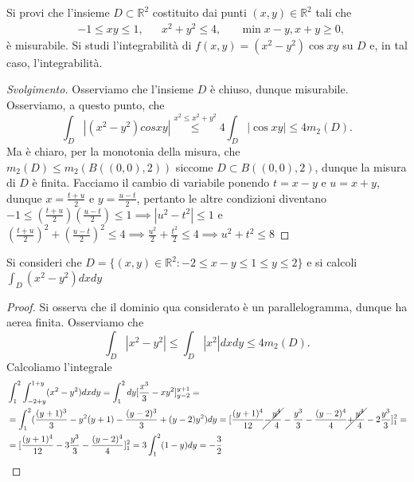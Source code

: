 \begin{exercise}
	Si provi che l'insieme $D \subset \mathbb{R}^2$ costituito dai punti $(x, y) \in \mathbb{R}^2$ tali che
	\begin{align*}
	&-1 \leq xy \leq 1, & &x^2 + y^2 \leq 4, & &\min{x-y, x+y} \geq 0,  
	\end{align*}
	è misurabile. Si studi l'integrabilità di $f(x, y) = (x^2 - y^2)\cos{xy}$ su $D$ e, in tal caso, l'integrabilità.
\end{exercise}
\begin{proof}[Svolgimento]
	Osserviamo che l'insieme $D$ è chiuso, dunque misurabile. Osserviamo, a questo punto, che
	$$
		\int_D |(x^2 - y^2)cos{xy}| \stackrel{x^2 \leq x^2 + y^2}{\leq} 4 \int_D |\cos{xy}| \leq 4 m_2(D).
	$$
	Ma è chiaro, per la monotonia della misura, che $m_2(D) \leq m_2(B((0, 0), 2))$ siccome $D \subset B((0, 0), 2)$, dunque la misura di $D$ è finita.
	Facciamo il cambio di variabile ponendo $t = x - y$ e $u = x+y$, dunque $x = \frac{t+u}{2}$ e $y = \frac{u-t}{2}$, pertanto le altre condizioni diventano
	$
	-1 \leq (\frac{t+u}{2})(\frac{u-t}{2}) \leq 1 \implies |u^2 - t^2| \leq 1
	$
	e $(\frac{t+u}{2})^2 + (\frac{u-t}{2})^2 \leq 4 \implies \frac{u^2}{2} + \frac{t^2}{2} \leq 4 \implies u^2 + t^2 \leq 8$
\end{proof}
\begin{exercise}
	Si consideri che $D = \{(x, y) \in \mathbb{R}^2 : -2 \leq x - y \leq 1 \leq y \leq 2 \}$ e si calcoli $\int_D (x^2 - y^2)dxdy$
\end{exercise}
\begin{proof}
	Si osserva che il dominio qua considerato è un parallelogramma, dunque ha aerea finita. Osserviamo che
	$$
		\int_D |x^2 - y^2| \leq \int_D |x^2|dxdy \leq 4 m_2(D).
	$$
	Calcoliamo l'integrale
	\begin{align*}
		&\int_1^2 \int_{-2 + y}^{1 + y} (x^2 - y^2) dxdy = \int_1^2 dy [\frac{x^3}{3} - xy^2]^{y+1}_{y-2} = \\
		&=\int_1^2 (\frac{(y+1)^3}{3} - y^2(y+1) - \frac{(y-2)^3}{3} + (y-2)y^2)dy = [\frac{(y+1)^4}{12} \cancel{- \frac{y^4}{4}} - \frac{y^3}{3} - \frac{(y-2)^4}{4} \cancel{+ \frac{y^4}{4}} - 2\frac{y^3}{3}]^2_1 = \\
		&=[\frac{(y+1)^4}{12} - 3\frac{y^3}{3} - \frac{(y-2)^4}{4}]^2_1 = 3 \int_1^2 (1-y)dy = - \frac{3}{2}
	\end{align*}
\end{proof}